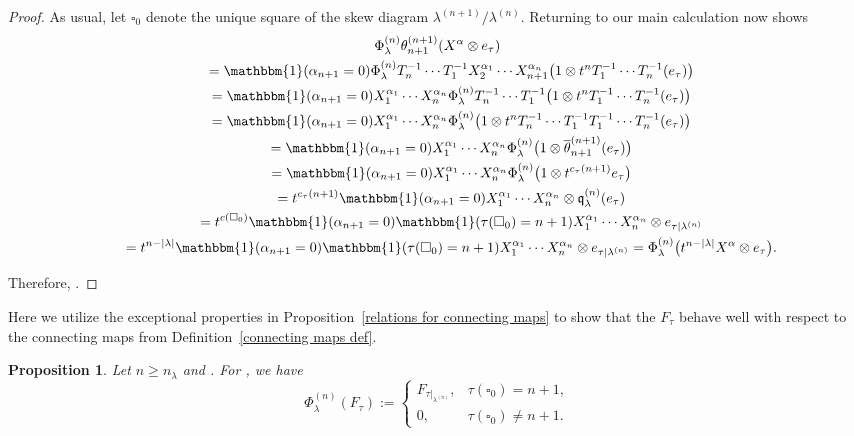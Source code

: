 \documentclass[10pt,a4paper]{amsart}
\numberwithin{equation}{section}
\newtheorem{Proposition}[Theorem]{Proposition}
\theoremstyle{definition}
\DeclareMathOperator{\PSYT}{\mathrm{PSYT}_{\geq 0}}
\begin{document}
\begin{proof}
As usual, let $\square_0$ denote the unique square of the skew diagram $\lambda^{(n+1)}/\lambda^{(n)}$. Returning to our main calculation now shows
\begin{gather*}
 \Phi^{(n)}_{\lambda} \theta_{n+1}^{(n+1)}(X^{\alpha} \otimes e_{\tau}) \\
 \qquad =\mathbbm{1}(\alpha_{n+1} =0)\Phi^{(n)}_{\lambda}T_n^{-1}\cdots T_1^{-1}X_2^{\alpha_1}\cdots X_{n+1}^{\alpha_n} \bigl(1\otimes t^nT_1^{-1}\cdots T_n^{-1}(e_{\tau})\bigr) \\
 \qquad = \mathbbm{1}(\alpha_{n+1} =0)X_1^{\alpha_1}\cdots X_{n}^{\alpha_{n}}\Phi^{(n)}_{\lambda}T_n^{-1}\cdots T_1^{-1} \bigl(1\otimes t^nT_1^{-1}\cdots T_n^{-1}(e_{\tau})\bigr) \\
 \qquad = \mathbbm{1}(\alpha_{n+1} =0)X_1^{\alpha_1}\cdots X_{n}^{\alpha_{n}}\Phi^{(n)}_{\lambda}\bigl(1 \otimes t^nT_n^{-1}\cdots T_1^{-1}T_1^{-1}\cdots T_n^{-1}(e_{\tau})\bigr) \\
 \qquad = \mathbbm{1}(\alpha_{n+1} =0)X_1^{\alpha_1}\cdots X_{n}^{\alpha_{n}}\Phi^{(n)}_{\lambda}\bigl(1 \otimes \overline{\theta}_{n+1}^{(n+1)}(e_{\tau})\bigr) \\
 \qquad = \mathbbm{1}(\alpha_{n+1} =0)X_1^{\alpha_1}\cdots X_{n}^{\alpha_{n}}\Phi^{(n)}_{\lambda}\bigl(1 \otimes t^{c_{\tau}(n+1)}e_{\tau}\bigr) \\
 \qquad = t^{c_{\tau}(n+1)}\mathbbm{1}(\alpha_{n+1} =0)X_1^{\alpha_1}\cdots X_{n}^{\alpha_{n}}\otimes \mathfrak{q}_{\lambda}^{(n)}(e_{\tau}) \\
 \qquad = t^{c(\square_0)}\mathbbm{1}(\alpha_{n+1} =0)\mathbbm{1}( \tau(\square_0) = n+1)X_1^{\alpha_1}\cdots X_{n}^{\alpha_{n}}\otimes e_{\tau|{\lambda^{(n)}}} \\
 \qquad = t^{n-|\lambda|} \mathbbm{1}(\alpha_{n+1} =0)\mathbbm{1}( \tau(\square_0) = n+1)X_1^{\alpha_1}\cdots X_{n}^{\alpha_{n}}\otimes e_{\tau|{\lambda^{(n)}}} = \Phi^{(n)}_{\lambda}\bigl(t^{n-|\lambda|}X^{\alpha}\otimes e_{\tau}\bigr).
\end{gather*}

Therefore,
.
\end{proof}

Here we utilize the exceptional properties in Proposition~\ref{relations for connecting maps} to show that the $F_{\tau}$ behave well with respect to the connecting maps  from Definition~\ref{connecting maps def}.

\begin{Proposition}\label{stability for locally maximal psyt}
 Let $n \geq n_{\lambda}$ and . For \smash{$\tau \in \PSYT\bigl(\lambda^{(n+1)}\bigr)$}, we have
 \[
 \Phi^{(n)}_{\lambda}(F_{\tau}) := \begin{cases}
 F_{\tau|_{\lambda^{(n)}}}, & \tau(\square_0) = n+1,\\
 0, & \tau(\square_0) \neq n+1.
 \end{cases}
 \]

\end{Proposition}
\end{document}

